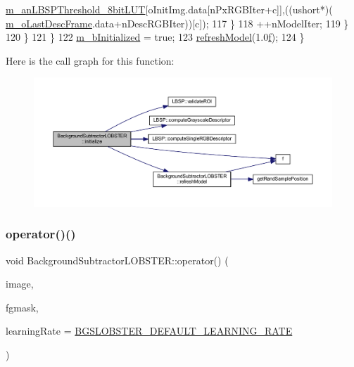 \begin{DoxyCode}
      \mbox{\hyperlink{class_background_subtractor_l_b_s_p_aefe69d94f08b2c4ba73ad1d254ad9153}{m\_anLBSPThreshold\_8bitLUT}}[oInitImg.data[nPxRGBIter+c]],((ushort*)(
      \mbox{\hyperlink{class_background_subtractor_l_b_s_p_a9c637c0b87cac495887295690d83ba13}{m\_oLastDescFrame}}.data+nDescRGBIter))[c]);
117                 \}
118                 ++nModelIter;
119             \}
120         \}
121     \}
122     \mbox{\hyperlink{class_background_subtractor_l_b_s_p_a55cea104a0924fd50d5bed0912828a7e}{m\_bInitialized}} = \textcolor{keyword}{true};
123     \mbox{\hyperlink{class_background_subtractor_l_o_b_s_t_e_r_aeb3b23c1f47cfe71a73f3ca47ec06a75}{refreshModel}}(1.0\mbox{\hyperlink{rings_8cpp_a77369fc4d5326a16d2c603e032023528}{f}});
124 \}
\end{DoxyCode}
Here is the call graph for this function\+:\nopagebreak
\begin{figure}[H]
\begin{center}
\leavevmode
\includegraphics[width=350pt]{class_background_subtractor_l_o_b_s_t_e_r_a452bea31dcbd2e10efc701cc2cd25776_cgraph}
\end{center}
\end{figure}
\mbox{\label{class_background_subtractor_l_o_b_s_t_e_r_a0c0faf2754a7a74a6ae56cea47207070}} 
\subsubsection{\texorpdfstring{operator()()}{operator()()}}
{\footnotesize\ttfamily void Background\+Subtractor\+L\+O\+B\+S\+T\+E\+R\+::operator() (\begin{DoxyParamCaption}\item[{cv\+::\+Input\+Array}]{image,  }\item[{cv\+::\+Output\+Array}]{fgmask,  }\item[{double}]{learning\+Rate = {\ttfamily \mbox{\hyperlink{_background_subtractor_l_o_b_s_t_e_r_8h_a2d317f4a065c4c58c7241080d9c4457c}{B\+G\+S\+L\+O\+B\+S\+T\+E\+R\+\_\+\+D\+E\+F\+A\+U\+L\+T\+\_\+\+L\+E\+A\+R\+N\+I\+N\+G\+\_\+\+R\+A\+TE}}} }\end{DoxyParamCaption})\hspace{0.3cm}{\ttfamily [virtual]}}



